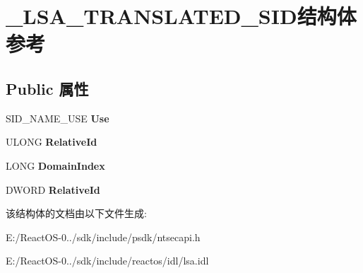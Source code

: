 \hypertarget{struct___l_s_a___t_r_a_n_s_l_a_t_e_d___s_i_d}{}\section{\+\_\+\+L\+S\+A\+\_\+\+T\+R\+A\+N\+S\+L\+A\+T\+E\+D\+\_\+\+S\+I\+D结构体 参考}
\label{struct___l_s_a___t_r_a_n_s_l_a_t_e_d___s_i_d}
\subsection*{Public 属性}
\begin{DoxyCompactItemize}
\item 
\mbox{\label{struct___l_s_a___t_r_a_n_s_l_a_t_e_d___s_i_d_af823df328680704d7a7338df6751f64d}} 
S\+I\+D\+\_\+\+N\+A\+M\+E\+\_\+\+U\+SE {\bfseries Use}
\item 
\mbox{\label{struct___l_s_a___t_r_a_n_s_l_a_t_e_d___s_i_d_a28c28a0355e1c19d65745d11e51cdcf5}} 
U\+L\+O\+NG {\bfseries Relative\+Id}
\item 
\mbox{\label{struct___l_s_a___t_r_a_n_s_l_a_t_e_d___s_i_d_a419450b2c9ce9ac40f6932a2d4c723b1}} 
L\+O\+NG {\bfseries Domain\+Index}
\item 
\mbox{\label{struct___l_s_a___t_r_a_n_s_l_a_t_e_d___s_i_d_a7970661a026ab72fa2cde4abe360c488}} 
D\+W\+O\+RD {\bfseries Relative\+Id}
\end{DoxyCompactItemize}


该结构体的文档由以下文件生成\+:\begin{DoxyCompactItemize}
\item 
E\+:/\+React\+O\+S-\/0../sdk/include/psdk/ntsecapi.\+h\item 
E\+:/\+React\+O\+S-\/0../sdk/include/reactos/idl/lsa.\+idl\end{DoxyCompactItemize}
